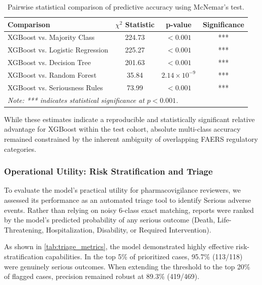\documentclass[10pt]{article}
\begin{document}
\begin{table}[htbp]
\centering
\caption{Pairwise statistical comparison of predictive accuracy using McNemar's test.}
\label{tab:mcnemar}
\begin{tabular}{|l|c|c|c|}
\hline
\textbf{Comparison} & \textbf{$\chi^2$ Statistic} & \textbf{p-value} & \textbf{Significance} \\
\hline
XGBoost vs. Majority Class & 224.73 & $<0.001$ & *** \\
XGBoost vs. Logistic Regression & 225.27 & $<0.001$ & *** \\
XGBoost vs. Decision Tree & 201.63 & $<0.001$ & *** \\
XGBoost vs. Random Forest & 35.84 & $2.14 \times 10^{-9}$ & *** \\
XGBoost vs. Seriousness Rules & 73.99 & $<0.001$ & *** \\
\hline
\multicolumn{4}{|l|}{\footnotesize \textit{Note: *** indicates statistical significance at $p < 0.001$.}} \\
\hline
\end{tabular}
\end{table}

While these estimates indicate a reproducible and statistically significant relative advantage for XGBoost within the test cohort, absolute multi-class accuracy remained constrained by the inherent ambiguity of overlapping FAERS regulatory categories.

\subsubsection{Operational Utility: Risk Stratification and Triage}
To evaluate the model's practical utility for pharmacovigilance reviewers, we assessed its performance as an automated triage tool to identify Serious adverse events. Rather than relying on noisy 6-class exact matching, reports were ranked by the model's predicted probability of any serious outcome (Death, Life-Threatening, Hospitalization, Disability, or Required Intervention).

As shown in \cref{tab:triage_metrics}, the model demonstrated highly effective risk-stratification capabilities. In the top 5\% of prioritized cases, 95.7\% (113/118) were genuinely serious outcomes. When extending the threshold to the top 20\% of flagged cases, precision remained robust at 89.3\% (419/469).
\end{document}
